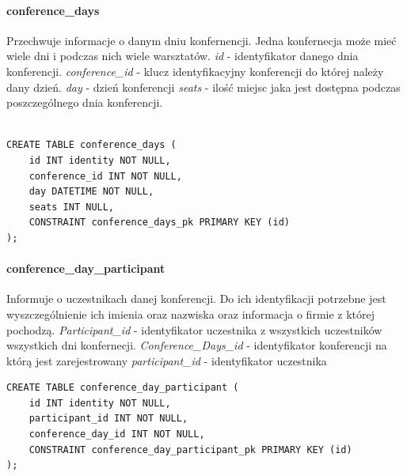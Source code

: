 \documentclass[12pt]{article}
\begin{document}
\paragraph{conference\_days \newline}
Przechwuje informacje o danym dniu konfernencji. Jedna konfernecja może mieć wiele dni i podczas nich wiele warsztatów. \newline \newline
\textit{id} - identyfikator danego dnia konferencji. \newline
\textit{conference\_id} - klucz identyfikacyjny konferencji do której należy dany dzień. \newline
\textit{day} - dzień konferencji \newline
\textit{seats} - ilość miejsc jaka jest dostępna podczas poszczególnego dnia konferencji.\\ \\
\begin{lstlisting}
CREATE TABLE conference_days (
	id INT identity NOT NULL,
	conference_id INT NOT NULL,
	day DATETIME NOT NULL,
	seats INT NULL,
	CONSTRAINT conference_days_pk PRIMARY KEY (id)
);
\end{lstlisting}
\paragraph{conference\_day\_participant \newline}
Informuje o uczestnikach danej konferencji. Do ich identyfikacji potrzebne jest wyszczególnienie ich imienia oraz nazwiska oraz informacja o firmie z której pochodzą. \newline \newline
\textit{Participant\_id} - identyfikator uczestnika z wszystkich uczestników wszystkich dni konfernecji. \newline
\textit{Conference\_Days\_id} - identyfikator konferencji na którą jest zarejestrowany \newline
\textit{participant\_id} - identyfikator uczestnika \newline
\begin{lstlisting}
CREATE TABLE conference_day_participant (
	id INT identity NOT NULL,
	participant_id INT NOT NULL,
	conference_day_id INT NOT NULL,
	CONSTRAINT conference_day_participant_pk PRIMARY KEY (id)
);
 \end{lstlisting}
\end{document}
